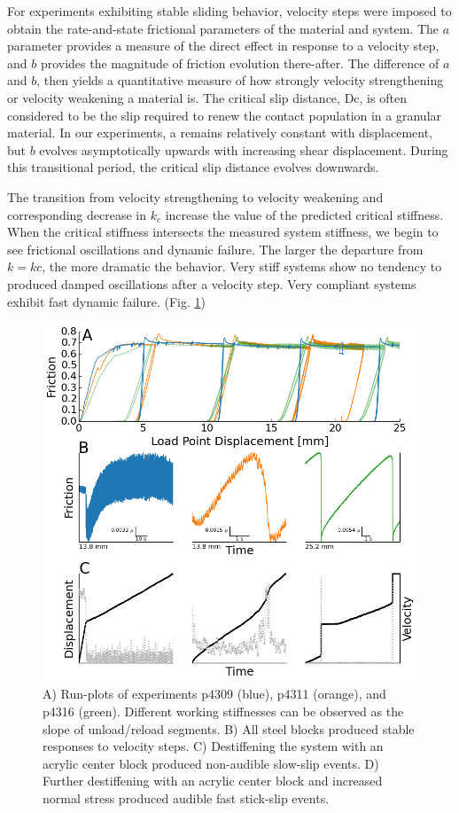\documentclass[11pt]{article}
\begin{document}
For experiments exhibiting stable sliding behavior, velocity steps were imposed
to obtain the rate-and-state frictional parameters of the material and system.
The $a$ parameter provides a measure of the direct effect in response to a
velocity step, and $b$ provides the magnitude of friction evolution there-after.
The difference of $a$ and $b$, then yields a quantitative measure of how
strongly velocity strengthening or velocity weakening a material is. The
critical slip distance, Dc, is often considered to be the slip required to renew
the contact population in a granular material. In our experiments, a remains
relatively constant with displacement, but $b$ evolves asymptotically upwards
with increasing shear displacement. During this transitional period, the
critical slip distance evolves downwards.

The transition from velocity strengthening to velocity weakening and
corresponding decrease in $k_c$ increase the value of the predicted critical
stiffness. When the critical stiffness intersects the measured system stiffness,
we begin to see frictional oscillations and dynamic failure. The larger the
departure from $k=kc$, the more dramatic the behavior. Very stiff systems show
no tendency to produced damped oscillations after a velocity step. Very
compliant systems exhibit fast dynamic failure. (Fig. \ref{Figure:Runplot})

\begin{figure}
	\centering
		\includegraphics[scale=0.7]{../Figures/Fig_Runplot/runplot.png}
   	\caption{A) Run-plots of experiments p4309 (blue), p4311 (orange), and p4316 (green).
Different working stiffnesses can be observed as the slope of unload/reload
segments. B) All steel blocks produced stable responses to velocity steps.
C) Destiffening the system with an acrylic center block produced non-audible
slow-slip events. D) Further destiffening with an acrylic center block and
increased normal stress produced audible fast stick-slip events.   }
  	\label{Figure:Runplot}
\end{figure}
\end{document}
